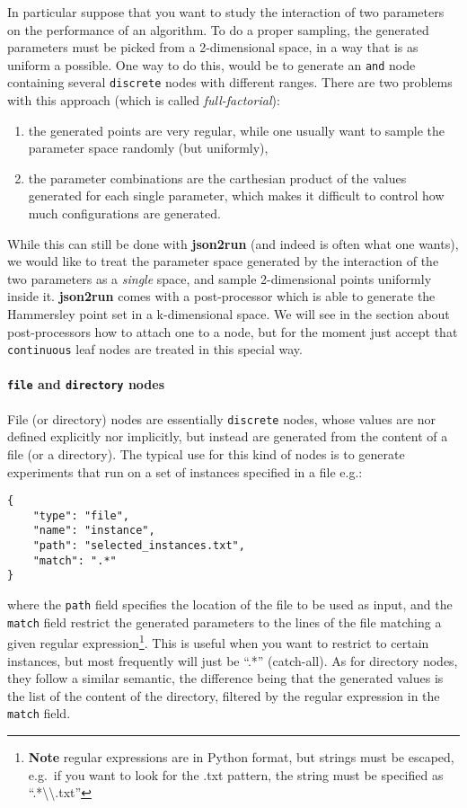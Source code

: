 \documentclass[11pt,notitlepage,twoside,a4paper]{article}
\begin{document}
In particular suppose that you want to study the interaction of two
parameters on the performance of an algorithm. To do a proper sampling,
the generated parameters must be picked from a 2-dimensional space, in a
way that is as uniform a possible. One way to do this, would be to
generate an \texttt{and} node containing several \texttt{discrete} nodes
with different ranges. There are two problems with this approach (which
is called \emph{full-factorial}):

\begin{enumerate}
\item
  the generated points are very regular, while one usually want to
  sample the parameter space randomly (but uniformly),
\item
  the parameter combinations are the carthesian product of the values
  generated for each single parameter, which makes it difficult to
  control how much configurations are generated.
\end{enumerate}

While this can still be done with \textbf{json2run} (and indeed is often
what one wants), we would like to treat the parameter space generated by
the interaction of the two parameters as a \emph{single} space, and
sample 2-dimensional points uniformly inside it. \textbf{json2run} comes
with a post-processor which is able to generate the Hammersley point set
in a k-dimensional space. We will see in the section about
post-processors how to attach one to a node, but for the moment just
accept that \texttt{continuous} leaf nodes are treated in this special
way.

\paragraph{\texttt{file} and \texttt{directory} nodes}

File (or directory) nodes are essentially \texttt{discrete} nodes, whose
values are nor defined explicitly nor implicitly, but instead are
generated from the content of a file (or a directory). The typical use
for this kind of nodes is to generate experiments that run on a set of
instances specified in a file e.g.:

\begin{lstlisting}
{
    "type": "file",
    "name": "instance",
    "path": "selected_instances.txt",
    "match": ".*"
}
\end{lstlisting}

\noindent
where the \texttt{path} field specifies the location of the file to be
used as input, and the \texttt{match} field restrict the generated
parameters to the lines of the file matching a given regular
expression\footnote{\textbf{Note} regular expressions are in Python
  format, but strings must be escaped, e.g.~if you want to look for the
  .txt pattern, the string must be specified as
  ``.*\textbackslash{}\textbackslash{}.txt''}. This is useful when you
want to restrict to certain instances, but most frequently will just be
``.*'' (catch-all). As for directory nodes, they follow a similar
semantic, the difference being that the generated values is the list of
the content of the directory, filtered by the regular expression in the
\texttt{match} field.
\end{document}
